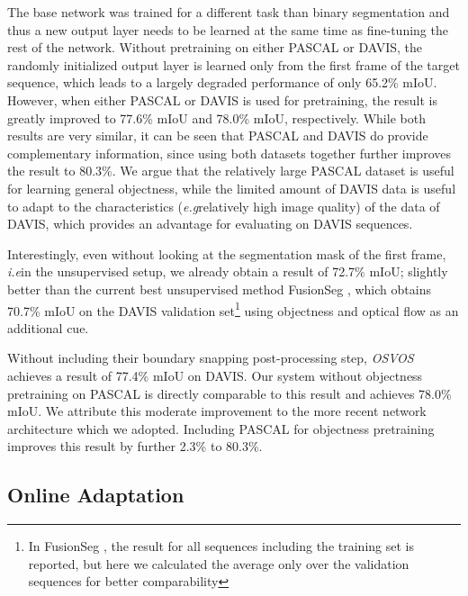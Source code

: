 \documentclass{bmvc2k}
\newcommand{\methodname}[1]{\mbox{\emph{#1}}}
\def\eg{\emph{e.g}\bmvaOneDot}
\def\ie{\emph{i.e}\bmvaOneDot}
\newcommand{\PAR}[1]{\vskip4pt \noindent {\bf #1~}}
\begin{document}
The base network was trained for a different task than binary segmentation and thus a new output layer needs to be learned at the same time as fine-tuning the rest of the network. Without pretraining on either PASCAL or DAVIS, the randomly initialized output layer is learned only from the first frame of the target sequence, which leads to a largely degraded performance of only 65.2\% mIoU. However, when either PASCAL or DAVIS is used for pretraining, the result is greatly improved to 77.6\% mIoU and 78.0\% mIoU, respectively. While both results are very similar, it can be seen that PASCAL and DAVIS do provide complementary information, since using both datasets together further improves the result to 80.3\%. We argue that the relatively large PASCAL dataset is useful for learning general objectness, while the limited amount of DAVIS data is useful to adapt to the characteristics (\eg relatively high image quality) of the data of DAVIS, which provides an advantage for evaluating on DAVIS sequences.

Interestingly, even without looking at the segmentation mask of the first frame, \ie in the unsupervised setup, we already obtain a result of 72.7\% mIoU; slightly better than the current best unsupervised method FusionSeg \cite{fusionseg}, which obtains 70.7\% mIoU on the DAVIS validation set\footnote{In FusionSeg \cite{fusionseg}, the result for all sequences including the training set is reported, but here we calculated the average only over the validation sequences for better comparability} using objectness and optical flow as an additional cue.

\PAR{Comparison to \methodname{OSVOS}.}
Without including their boundary snapping post-processing step, \methodname{OSVOS} achieves a result of 77.4\% mIoU on DAVIS. Our system without objectness pretraining on PASCAL is directly comparable to this result and achieves 78.0\% mIoU. We attribute this moderate improvement to the more recent network architecture which we adopted. Including PASCAL for objectness pretraining improves this result by further 2.3\% to 80.3\%.

\subsection{Online Adaptation}
\end{document}
